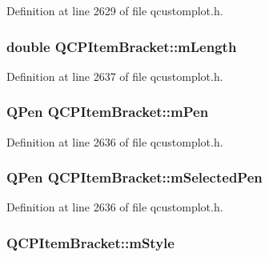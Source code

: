 Definition at line 2629 of file qcustomplot.\-h.

\hypertarget{class_q_c_p_item_bracket_ab3d99bba8da18eb4d0e0cb23dded33b2}{
\subsubsection[{m\-Length}]{\setlength{\rightskip}{0pt plus 5cm}double Q\-C\-P\-Item\-Bracket\-::m\-Length\hspace{0.3cm}{\ttfamily [protected]}}}\label{class_q_c_p_item_bracket_ab3d99bba8da18eb4d0e0cb23dded33b2}


Definition at line 2637 of file qcustomplot.\-h.

\hypertarget{class_q_c_p_item_bracket_a350c864a5853b04343719f5a8be6b675}{
\subsubsection[{m\-Pen}]{\setlength{\rightskip}{0pt plus 5cm}Q\-Pen Q\-C\-P\-Item\-Bracket\-::m\-Pen\hspace{0.3cm}{\ttfamily [protected]}}}\label{class_q_c_p_item_bracket_a350c864a5853b04343719f5a8be6b675}


Definition at line 2636 of file qcustomplot.\-h.

\hypertarget{class_q_c_p_item_bracket_adcfb53602d1802d00e2de4fd6df6b291}{
\subsubsection[{m\-Selected\-Pen}]{\setlength{\rightskip}{0pt plus 5cm}Q\-Pen Q\-C\-P\-Item\-Bracket\-::m\-Selected\-Pen\hspace{0.3cm}{\ttfamily [protected]}}}\label{class_q_c_p_item_bracket_adcfb53602d1802d00e2de4fd6df6b291}


Definition at line 2636 of file qcustomplot.\-h.

\hypertarget{class_q_c_p_item_bracket_ac911907184c824d621f274f8e0990080}{
\subsubsection[{m\-Style}]{ Q\-C\-P\-Item\-Bracket\-::m\-Style\hspace{0.3cm}{\ttfamily [protected]}}}\label{class_q_c_p_item_bracket_ac911907184c824d621f274f8e0990080}


